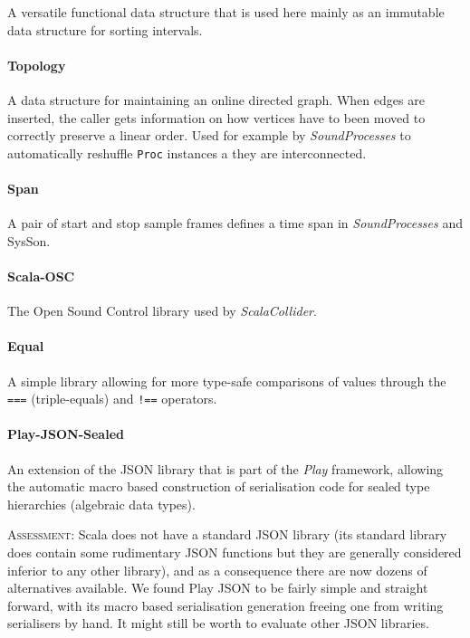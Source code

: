 \documentclass[11pt,a4paper]{article}
\newcommand{\software}[1]{\textit{#1}}
\newcommand{\sysson}[0]{SysSon}
\newcommand{\assessment}[0]{\textsc{Assessment:}}
\begin{document}
A versatile functional data structure that is used here mainly as an immutable data structure for sorting intervals.

\paragraph{Topology}

A data structure for maintaining an online directed graph. When edges are inserted, the caller gets information on how vertices have to been moved to correctly preserve a linear order. Used for example by \software{SoundProcesses} to automatically reshuffle \verb!Proc! instances a they are interconnected.

\paragraph{Span}

A pair of start and stop sample frames defines a time span in \software{SoundProcesses} and \sysson{}.

\paragraph{Scala-OSC}

The Open Sound Control library used by \software{ScalaCollider}.

\paragraph{Equal}

A simple library allowing for more type-safe comparisons of values through the \verb!===! (triple-equals) and \verb$!==$ operators.

\paragraph{Play-JSON-Sealed}

An extension of the JSON library that is part of the \software{Play} framework, allowing the automatic macro based construction of serialisation code for sealed type hierarchies (algebraic data types).

\assessment{} Scala does not have a standard JSON library (its standard library does contain some rudimentary JSON functions but they are generally considered inferior to any other library), and as a consequence there are now dozens of alternatives available. We found Play JSON to be fairly simple and straight forward, with its macro based serialisation generation freeing one from writing serialisers by hand. It might still be worth to evaluate other JSON libraries.
\end{document}
